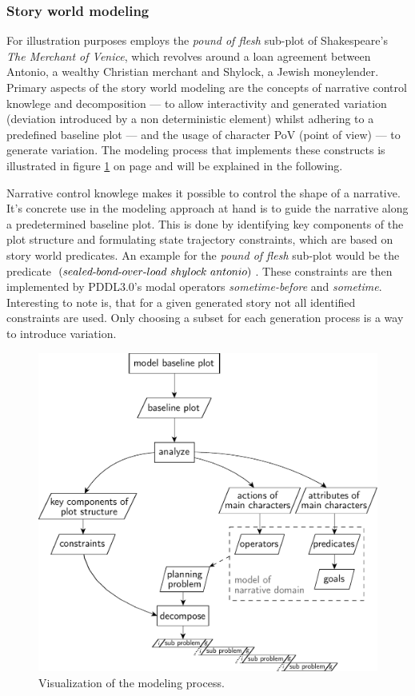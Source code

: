 \subsubsection{Story world modeling}
For illustration purposes \cite{Porteous10} employs the \emph{pound of flesh} sub-plot of Shakespeare's \emph{The Merchant of Venice}, which revolves around a loan agreement between Antonio, a wealthy Christian merchant and Shylock, a Jewish moneylender. Primary aspects of the story world modeling are the concepts of narrative control knowlege and decomposition --- to allow interactivity and generated variation (deviation introduced by a non deterministic element) whilst adhering to a predefined baseline plot --- and the usage of character PoV (point of view) --- to generate variation. The modeling process that implements these constructs is illustrated in figure \ref{fig:modproc} on page \pageref{fig:modproc} and will be explained in the following.

Narrative control knowlege makes it possible to control the shape of a narrative. It's concrete use in the modeling approach at hand is to guide the narrative along a predetermined baseline plot. This is done by identifying key components of the plot structure and formulating state trajectory constraints, which are based on story world predicates. An example for the \emph{pound of flesh} sub-plot would be the predicate $(sealed\h bond\h over\h load\ shylock\ antonio)$. These constraints are then implemented by PDDL3.0's modal operators \emph{some\-time-before} and \emph{sometime}. Interesting to note is, that for a given generated story not all identified constraints are used. Only choosing a subset for each generation process is a way to introduce variation.
\begin{figure}[htbp]
 \centering
 \includegraphics[scale=0.6]{discourse_model}
 \caption{Visualization of the modeling process.}
 \label{fig:modproc}
\end{figure}

